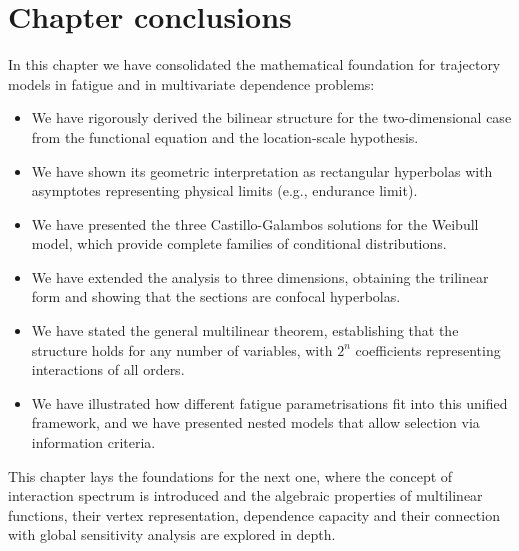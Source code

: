 \section*{Chapter conclusions}

In this chapter we have consolidated the mathematical foundation for trajectory models in fatigue and in multivariate dependence problems:

\begin{itemize}
    \item We have rigorously derived the bilinear structure for the two-dimensional case from the functional equation and the location-scale hypothesis.
    \item We have shown its geometric interpretation as rectangular hyperbolas with asymptotes representing physical limits (e.g., endurance limit).
    \item We have presented the three Castillo-Galambos solutions for the Weibull model, which provide complete families of conditional distributions.
    \item We have extended the analysis to three dimensions, obtaining the trilinear form and showing that the sections are confocal hyperbolas.
    \item We have stated the general multilinear theorem, establishing that the structure holds for any number of variables, with \(2^n\) coefficients representing interactions of all orders.
    \item We have illustrated how different fatigue parametrisations fit into this unified framework, and we have presented nested models that allow selection via information criteria.
\end{itemize}

This chapter lays the foundations for the next one, where the concept of interaction spectrum is introduced and the algebraic properties of multilinear functions, their vertex representation, dependence capacity and their connection with global sensitivity analysis are explored in depth. 